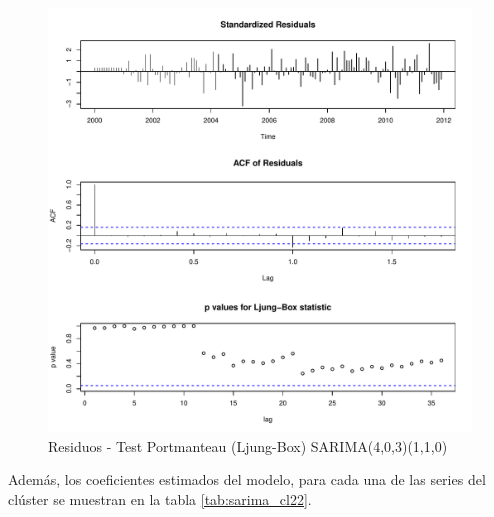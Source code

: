 \documentclass[12pt,oneside]{book}\usepackage[]{graphicx}\usepackage[]{color}
\makeatletter
\def\maxwidth{ %
  \ifdim\Gin@nat@width>\linewidth
    \linewidth
  \else
    \Gin@nat@width
  \fi
}
\newenvironment{knitrout}{}{} %
\theoremstyle{definition} %
\makeatother
\begin{document}
\begin{knitrout}
\color{fgcolor}\begin{figure}[h]

{\centering \includegraphics[width=\maxwidth]{figure/unnamed-chunk-80-1} 

}

\caption[Residuos - Test Portmanteau (Ljung-Box) SARIMA(4,0,3)(1,1,0)]{Residuos - Test Portmanteau (Ljung-Box) SARIMA(4,0,3)(1,1,0)}\label{fig:unnamed-chunk-80}
\end{figure}


\end{knitrout}


Además, los coeficientes estimados del modelo, para cada una de las series del clúster se muestran en la tabla \ref{tab:sarima_cl22}.
\end{document}
